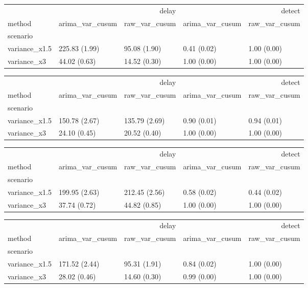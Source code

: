 \begin{tabular}{lllll}
\toprule
 & \multicolumn{2}{r}{delay} & \multicolumn{2}{r}{detect} \\
method & arima_var_cusum & raw_var_cusum & arima_var_cusum & raw_var_cusum \\
scenario &  &  &  &  \\
\midrule
variance_x1.5 & 225.83 (1.99) & 95.08 (1.90) & 0.41 (0.02) & 1.00 (0.00) \\
variance_x3 & 44.02 (0.63) & 14.52 (0.30) & 1.00 (0.00) & 1.00 (0.00) \\
\bottomrule
\end{tabular}

\begin{tabular}{lllll}
\toprule
 & \multicolumn{2}{r}{delay} & \multicolumn{2}{r}{detect} \\
method & arima_var_cusum & raw_var_cusum & arima_var_cusum & raw_var_cusum \\
scenario &  &  &  &  \\
\midrule
variance_x1.5 & 150.78 (2.67) & 135.79 (2.69) & 0.90 (0.01) & 0.94 (0.01) \\
variance_x3 & 24.10 (0.45) & 20.52 (0.40) & 1.00 (0.00) & 1.00 (0.00) \\
\bottomrule
\end{tabular}

\begin{tabular}{lllll}
\toprule
 & \multicolumn{2}{r}{delay} & \multicolumn{2}{r}{detect} \\
method & arima_var_cusum & raw_var_cusum & arima_var_cusum & raw_var_cusum \\
scenario &  &  &  &  \\
\midrule
variance_x1.5 & 199.95 (2.63) & 212.45 (2.56) & 0.58 (0.02) & 0.44 (0.02) \\
variance_x3 & 37.74 (0.72) & 44.82 (0.85) & 1.00 (0.00) & 1.00 (0.00) \\
\bottomrule
\end{tabular}

\begin{tabular}{lllll}
\toprule
 & \multicolumn{2}{r}{delay} & \multicolumn{2}{r}{detect} \\
method & arima_var_cusum & raw_var_cusum & arima_var_cusum & raw_var_cusum \\
scenario &  &  &  &  \\
\midrule
variance_x1.5 & 171.52 (2.44) & 95.31 (1.91) & 0.84 (0.02) & 1.00 (0.00) \\
variance_x3 & 28.02 (0.46) & 14.60 (0.30) & 0.99 (0.00) & 1.00 (0.00) \\
\bottomrule
\end{tabular}

